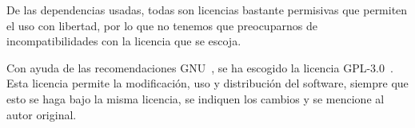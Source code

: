 De las dependencias usadas, todas son licencias bastante permisivas que permiten el uso con libertad, por lo que no tenemos que preocuparnos de incompatibilidades con la licencia que se escoja.

Con ayuda de las recomendaciones GNU~\cite{gnu-choose}, se ha escogido la licencia GPL-3.0~\cite{gpl3}. Esta licencia permite la modificación, uso y distribución del software, siempre que esto se haga bajo la misma licencia, se indiquen los cambios y se mencione al autor original.


